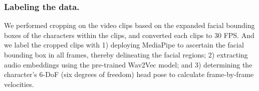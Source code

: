 \documentclass[runningheads]{llncs}
\begin{document}

\subsubsection{Labeling the data.}
We performed cropping on the video clips based on the expanded facial bounding boxes of the characters within the clips, and converted each clips to 30 FPS. And we label the cropped clips with 1) deploying MediaPipe\cite{mediapipe} to ascertain the facial bounding box in all frames, thereby delineating the facial regions; 2) extracting audio embeddings using the pre-trained Wav2Vec model\cite{wav2vec}; and 3) determining the character's 6-DoF (six degrees of freedom) head pose to calculate frame-by-frame velocities. 
\end{document}
